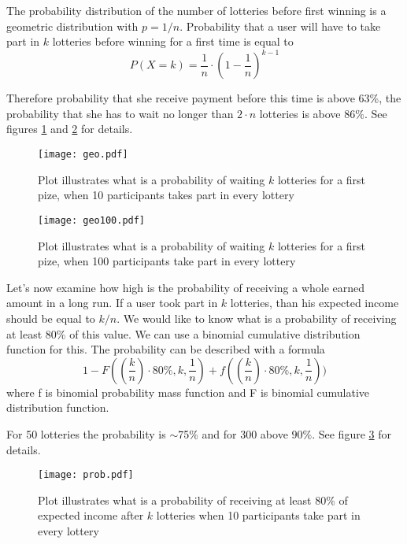 \documentclass[a4paper]{article}
\begin{document}
    The probability distribution of the number of lotteries before first winning is a geometric distribution with
    $p = 1/n$. Probability that a user will have to take part in $k$ lotteries before winning for a first time is
    equal to
    \begin{displaymath}
	    P(X = k) = \frac{1}{n} \cdot (1 - \frac{1}{n})^{k-1}
	\end{displaymath}

    Therefore probability that she receive payment before this time is above 63\%, the probability that she has to wait
    no longer than $2 \cdot n$ lotteries  is  above $86\%$. See figures \ref{fig:geo} and \ref{fig:geo100} for details.

    \begin{figure}
        \centering
        \texttt{[image: geo.pdf]}
        \caption{Plot illustrates what is a probability of waiting $k$ lotteries for a first pize, when 10 participants
        takes part in every lottery}
        \label{fig:geo}
    \end{figure}

    \begin{figure}
        \centering
        \texttt{[image: geo100.pdf]}
        \caption{Plot illustrates what is a probability of waiting $k$ lotteries for a first pize, when
        100 participants take part in every lottery}
        \label{fig:geo100}
    \end{figure}

    Let's now examine how high is the probability of receiving a whole earned amount in a long run. If a user took part
    in $k$ lotteries, than his expected income should be equal to $k/n$. We would like to know what is a probability
    of receiving at least  80\% of this value. We can use a binomial cumulative distribution function for this.
    The probability can be described with a formula
    \begin{displaymath}
        1 - F((\frac{k}{n})\cdot 80\%, k, \frac{1}{n}) + f((\frac{k}{n})\cdot 80\%, k, \frac{1}{n}))
    \end{displaymath}
    where f is binomial probability mass function and F is binomial cumulative distribution function.

    For 50 lotteries the probability is $\sim$75\%  and for 300 above $90\%$. See figure \ref{fig:prob} for details.


    \begin{figure}
        \centering
        \texttt{[image: prob.pdf]}
        \caption{Plot illustrates what is a probability of receiving at least 80\% of expected income after $k$
        lotteries when 10 participants take part in every lottery}
        \label{fig:prob}
    \end{figure}
\end{document}
